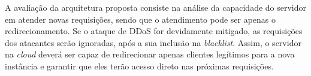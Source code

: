 

% 

A avaliação da arquitetura proposta consiste na análise
da capacidade do servidor em atender novas requisições, sendo que o atendimento pode ser apenas o redirecionamento. 
Se o ataque de DDoS for devidamente
mitigado, as requisições dos atacantes serão ignoradas, após a sua inclusão na \emph{blacklist}. Assim, o servidor na \emph{cloud} deverá ser capaz de redirecionar apenas clientes legítimos 
para a nova instância e garantir que eles terão acesso direto nas próximas requisições. 
%
%



